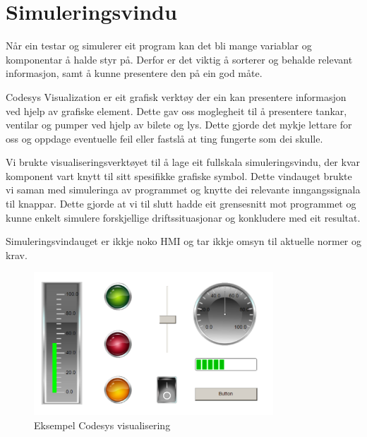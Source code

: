 \section{Simuleringsvindu}
\thispagestyle{fancy}

Når ein testar og simulerer eit program kan det bli mange variablar og komponentar
å halde styr på. Derfor er det viktig å sorterer og behalde relevant informasjon, 
samt å kunne presentere den på ein god måte.

\gls{Codesys} Visualization\citep{CodesysVizualisation} er eit grafisk verktøy der ein kan presentere informasjon
ved hjelp av grafiske element. Dette gav oss moglegheit til å presentere tankar, ventilar og pumper
ved hjelp av bilete og lys. 
Dette gjorde det mykje lettare for oss og oppdage eventuelle feil eller fastslå at ting fungerte som dei skulle.

Vi brukte visualiseringsverktøyet til å lage eit fullskala simuleringsvindu, der kvar komponent
vart knytt til sitt spesifikke grafiske symbol. Dette vindauget brukte vi saman med simuleringa
av programmet og knytte dei relevante inngangssignala til knappar. 
Dette gjorde at vi til slutt hadde eit grensesnitt mot programmet og kunne enkelt simulere
forskjellige driftssituasjonar og konkludere med eit resultat.

Simuleringsvindauget er ikkje noko \gls{HMI} og tar ikkje omsyn til aktuelle normer og krav.

\begin{figure}[htbp]
    \centering
    \includegraphics[width=0.8\textwidth]{Bilder/Codesys symbol.png}
    \caption{Eksempel \gls{Codesys} visualisering}\label{fig:CodesysVisualisering}
\end{figure}

\newpage
